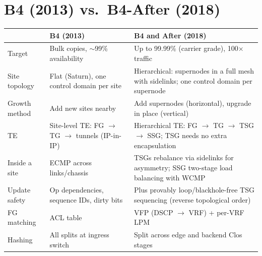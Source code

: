 \section{B4 (2013) vs.\ B4-After (2018)}
\begin{center}
\small
\begin{tabularx}{\linewidth}{@{}l X X@{}}
\toprule
 & \textbf{B4 (2013)} & \textbf{B4 and After (2018)} \\
\midrule
Target & Bulk copies, $\sim$99\% availability & Up to 99.99\% (carrier grade), 100$\times$ traffic \\
Site topology & Flat (Saturn), one control domain per site & Hierarchical: supernodes in a full mesh with sidelinks; one control domain per supernode \\
Growth method & Add new sites nearby & Add supernodes (horizontal), upgrade in place (vertical) \\
TE & Site-level TE: FG $\to$ TG $\to$ tunnels (IP-in-IP) & Hierarchical TE: FG $\to$ TG $\to$ TSG $\to$ SSG; TSG needs no extra encapsulation \\
Inside a site & ECMP across links/chassis & TSGs rebalance via sidelinks for asymmetry; SSG two-stage load balancing with WCMP \\
Update safety & Op dependencies, sequence IDs, dirty bits & Plus provably loop/blackhole-free TSG sequencing (reverse topological order) \\
FG matching & ACL table & VFP (DSCP $\to$ VRF) + per-VRF LPM \\
Hashing & All splits at ingress switch & Split across edge and backend Clos stages \\
\bottomrule
\end{tabularx}
\end{center}

